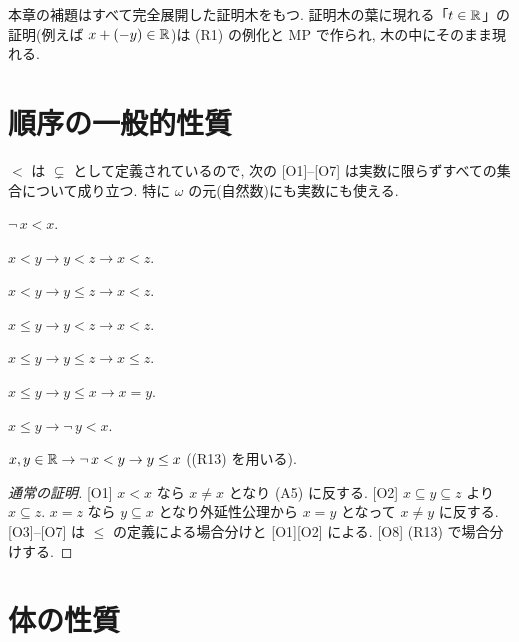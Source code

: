 本章の補題はすべて完全展開した証明木をもつ. 証明木の葉に現れる「$t \in \mathbb{R}$」の証明(例えば $x + (-y) \in \mathbb{R}$)は (R1) の例化と MP で作られ, 木の中にそのまま現れる.

\section{順序の一般的性質}

$<$ は $\subsetneq$ として定義されているので, 次の [O1]--[O7] は実数に限らずすべての集合について成り立つ. 特に $\omega$ の元(自然数)にも実数にも使える.

\begin{lem}\label{lem:order-general}
  \begin{enumerate}[label={[O\arabic*]}]
    \item $\neg\, x < x$.
    \item $x < y \to y < z \to x < z$.
    \item $x < y \to y \leq z \to x < z$.
    \item $x \leq y \to y < z \to x < z$.
    \item $x \leq y \to y \leq z \to x \leq z$.
    \item $x \leq y \to y \leq x \to x = y$.
    \item $x \leq y \to \neg\, y < x$.
    \item[{[O8]}] $x, y \in \mathbb{R} \to \neg\, x < y \to y \leq x$ \quad ((R13) を用いる).
  \end{enumerate}
\end{lem}
\begin{proof}[通常の証明]
  [O1] $x < x$ なら $x \neq x$ となり (A5) に反する. [O2] $x \subseteq y \subseteq z$ より $x \subseteq z$. $x = z$ なら $y \subseteq x$ となり外延性公理から $x = y$ となって $x \neq y$ に反する. [O3]--[O7] は $\leq$ の定義による場合分けと [O1][O2] による. [O8] (R13) で場合分けする.
\end{proof}

\section{体の性質}

